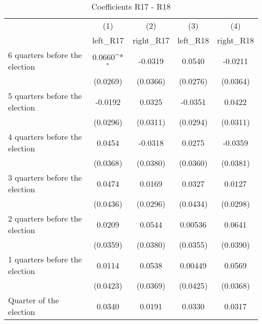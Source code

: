 \begin{table}[htbp]\centering
\def\sym#1{\ifmmode^{#1}\else\(^{#1}\)\fi}
\caption{Coefficients R17 - R18}
\begin{tabular}{l*{4}{c}}
\hline\hline
                    &\multicolumn{1}{c}{(1)}&\multicolumn{1}{c}{(2)}&\multicolumn{1}{c}{(3)}&\multicolumn{1}{c}{(4)}\\
                    &\multicolumn{1}{c}{left\_R17}&\multicolumn{1}{c}{right\_R17}&\multicolumn{1}{c}{left\_R18}&\multicolumn{1}{c}{right\_R18}\\
\hline
 6 quarters before the election&      0.0660\sym{*}  &     -0.0319         &      0.0540         &     -0.0211         \\
                    &    (0.0269)         &    (0.0366)         &    (0.0276)         &    (0.0364)         \\
[1em]
 5 quarters before the election&     -0.0192         &      0.0325         &     -0.0351         &      0.0422         \\
                    &    (0.0296)         &    (0.0311)         &    (0.0294)         &    (0.0311)         \\
[1em]
 4 quarters before the election&      0.0454         &     -0.0318         &      0.0275         &     -0.0359         \\
                    &    (0.0368)         &    (0.0380)         &    (0.0360)         &    (0.0381)         \\
[1em]
 3 quarters before the election&      0.0474         &      0.0169         &      0.0327         &      0.0127         \\
                    &    (0.0436)         &    (0.0296)         &    (0.0434)         &    (0.0298)         \\
[1em]
 2 quarters before the election&      0.0209         &      0.0544         &     0.00536         &      0.0641         \\
                    &    (0.0359)         &    (0.0380)         &    (0.0355)         &    (0.0390)         \\
[1em]
 1 quarters before the election&      0.0114         &      0.0538         &     0.00449         &      0.0569         \\
                    &    (0.0423)         &    (0.0369)         &    (0.0425)         &    (0.0368)         \\
[1em]
Quarter of the election&      0.0340         &      0.0191         &      0.0330         &      0.0317         \\

\end{tabular}
\end{table}
